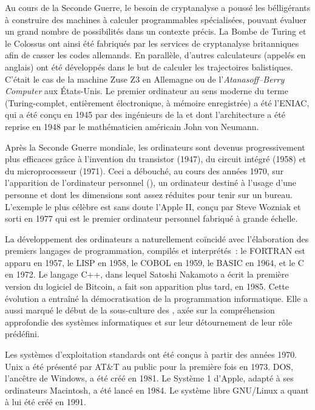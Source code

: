 Au cours de la Seconde Guerre, le besoin de cryptanalyse a poussé les bélligérants à construire des machines à calculer programmables spécialisées, pouvant évaluer un grand nombre de possibilités dans un contexte précis. La Bombe de Turing et le Colossus ont ainsi été fabriqués par les services de cryptanalyse britanniques afin de casser les codes allemands. En parallèle, d'autres calculateurs (appelés  en anglais) ont été développés dans le but de calculer les trajectoires balistiques. C'était le cas de la machine Zuse Z3 en Allemagne ou de l'\emph{Atanasoff–Berry Computer} aux États-Unis. Le premier ordinateur au sens moderne du terme (Turing-complet, entièrement électronique, à mémoire enregistrée) a été l'ENIAC, qui a été conçu en 1945 par des ingénieurs de la  et dont l'architecture a été reprise en 1948 par le mathématicien américain John von Neumann.

Après la Seconde Guerre mondiale, les ordinateurs sont devenus progressivement plus efficaces grâce à l'invention du transistor (1947), du circuit intégré (1958) et du microprocesseur (1971). Ceci a débouché, au cours des années 1970, sur l'apparition de l'ordinateur personnel (), un ordinateur destiné à l'usage d'une personne et dont les dimensions sont assez réduites pour tenir sur un bureau. L'exemple le plus célèbre est sans doute l'Apple II, conçu par Steve Wozniak et sorti en 1977 qui est le premier ordinateur personnel fabriqué à grande échelle.

La développement des ordinateurs a naturellement coïncidé avec l'élaboration des premiers langages de programmation, compilés et interprétés~: le FORTRAN est apparu en 1957, le LISP en 1958, le COBOL en 1959, le BASIC en 1964, et le C en 1972. Le langage C++, dans lequel Satoshi Nakamoto a écrit la première version du logiciel de Bitcoin, a fait son apparition plus tard, en 1985. Cette évolution a entraîné la démocratisation de la programmation informatique. Elle a aussi marqué le début de la sous-culture des , axée sur la compréhension approfondie des systèmes informatiques et sur leur détournement de leur rôle prédéfini. %

Les systèmes d'exploitation standards ont été conçus à partir des années 1970. Unix a été présenté par AT\&T au public pour la première fois en 1973. DOS, l'ancêtre de Windows, a été créé en 1981. Le Système 1 d'Apple, adapté à ses ordinateurs Macintosh, a été lancé en 1984. Le système libre GNU/Linux a quant à lui été créé en 1991.

